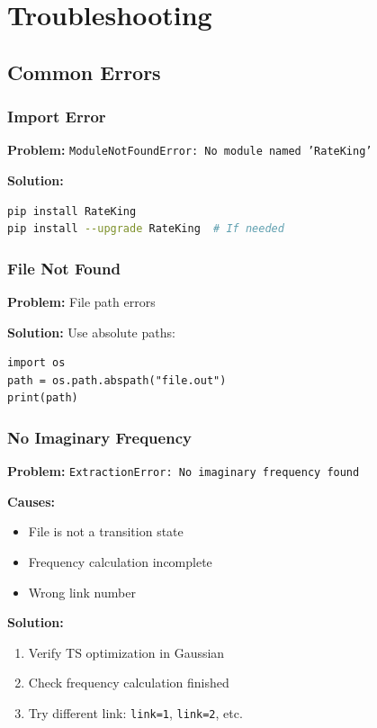 \documentclass[11pt,a4paper]{book}
\begin{document}
\chapter{Troubleshooting}

\section{Common Errors}

\subsection{Import Error}
\textbf{Problem:} \texttt{ModuleNotFoundError: No module named 'RateKing'}

\textbf{Solution:}
\begin{lstlisting}[language=bash]
pip install RateKing
pip install --upgrade RateKing  # If needed
\end{lstlisting}

\subsection{File Not Found}
\textbf{Problem:} File path errors

\textbf{Solution:} Use absolute paths:
\begin{lstlisting}
import os
path = os.path.abspath("file.out")
print(path)
\end{lstlisting}

\subsection{No Imaginary Frequency}
\textbf{Problem:} \texttt{ExtractionError: No imaginary frequency found}

\textbf{Causes:}
\begin{itemize}
  \item File is not a transition state
  \item Frequency calculation incomplete
  \item Wrong link number
\end{itemize}

\textbf{Solution:}
\begin{enumerate}
  \item Verify TS optimization in Gaussian
  \item Check frequency calculation finished
  \item Try different link: \texttt{link=1}, \texttt{link=2}, etc.
\end{enumerate}
\end{document}
